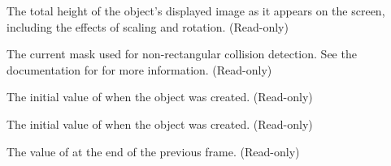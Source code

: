 \documentclass[letterpaper,10pt,english]{sphinxmanual}
\begin{document}
\begin{fulllineitems}
\begin{fulllineitems}
\end{fulllineitems}


\begin{fulllineitems}
\label{dsp:sge.dsp.Object.image_height}
The total height of the object's displayed image as it appears on
the screen, including the effects of scaling and rotation.
(Read-only)

\end{fulllineitems}


\begin{fulllineitems}
\label{dsp:sge.dsp.Object.mask}
The current mask used for non-rectangular collision detection.
See the documentation for {\hyperref[collision:sge.collision.masks_collide]{\emph{}}} for
more information.  (Read-only)

\end{fulllineitems}


\begin{fulllineitems}
\label{dsp:sge.dsp.Object.xstart}
The initial value of {\hyperref[dsp:sge.dsp.Object.x]{\emph{}}} when the object was created.
(Read-only)

\end{fulllineitems}


\begin{fulllineitems}
\label{dsp:sge.dsp.Object.ystart}
The initial value of {\hyperref[dsp:sge.dsp.Object.y]{\emph{}}} when the object was created.
(Read-only)

\end{fulllineitems}


\begin{fulllineitems}
\label{dsp:sge.dsp.Object.xprevious}
The value of {\hyperref[dsp:sge.dsp.Object.x]{\emph{}}} at the end of the previous frame.
(Read-only)

\end{fulllineitems}


\end{fulllineitems}
\end{document}
